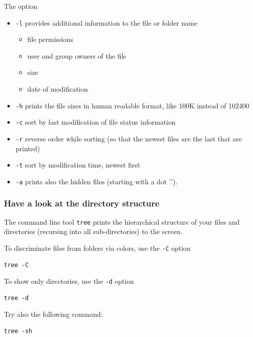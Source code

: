\documentclass[11pt]{article}
\begin{document}
The option
\begin{itemize}
\item \texttt{-l} provides additional information to the file or folder name
\begin{itemize}
\item file permissions
\item user and group owners of the file
\item size
\item date of modification
\end{itemize}
\item \texttt{-h} prints the file sizes in human readable format, like 100K instead of 102400
\item \texttt{-c} sort by last modification of file status information
\item \texttt{-r} reverse order while sorting (so that the newest files are the last that are printed)
\item \texttt{-t} sort by modification time, newest first
\item \texttt{-a} prints also the hidden files (starting with a dot '.').
\end{itemize}

\subsubsection{Have a look at the directory structure}
\label{sec:orgheadline6}
The command line tool \texttt{tree} prints the hierarchical structure of your
files and directories (recursing into all sub-directories) to the screen.

To discriminate files from folders via colors, use the \texttt{-C} option

\begin{verbatim}
tree -C
\end{verbatim}

To show only directories, use the \texttt{-d} option

\begin{verbatim}
tree -d
\end{verbatim}



Try also the following command:

\begin{verbatim}
tree -sh
\end{verbatim}
\end{document}
